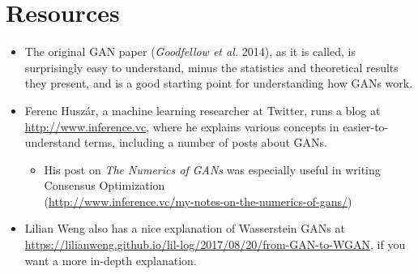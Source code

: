 \documentclass{article}
\begin{document}
\section{Resources}
\begin{itemize}

\item{The original GAN paper (\textit{Goodfellow et al.} 2014), as it is called, is surprisingly easy to understand, minus the statistics and theoretical results they present, and is a good starting point for understanding how GANs work.}

\item{Ferenc Huszár, a machine learning researcher at Twitter, runs a blog at \url{http://www.inference.vc}, where he explains various concepts in easier-to-understand terms, including a number of posts about GANs.
  \begin{itemize}
     \item{His post on \textit{The Numerics of GANs} was especially useful in writing Consensus Optimization \\ (\url{http://www.inference.vc/my-notes-on-the-numerics-of-gans/})}
  \end{itemize}
}

\item{Lilian Weng also has a nice explanation of Wasserstein GANs at \url{https://lilianweng.github.io/lil-log/2017/08/20/from-GAN-to-WGAN}, if you want a more in-depth explanation.}

\end{itemize}
\end{document}
